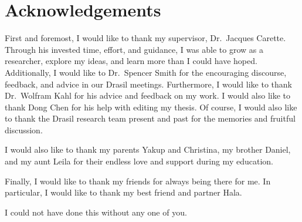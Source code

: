 \chapter{Acknowledgements}
\label{chap:acknowledgements}

First and foremost, I would like to thank my supervisor, Dr.\ Jacques Carette.
Through his invested time, effort, and guidance, I was able to grow as a
researcher, explore my ideas, and learn more than I could have hoped.
Additionally, I would like to Dr.\ Spencer Smith for the encouraging discourse,
feedback, and advice in our Drasil meetings. Furthermore, I would like to thank
Dr.\ Wolfram Kahl for his advice and feedback on my work. I would also like to
thank Dong Chen for his help with editing my thesis. Of course, I would also
like to thank the Drasil research team present and past for the memories and
fruitful discussion.

I would also like to thank my parents Yakup and Christina, my brother Daniel,
and my aunt Leila for their endless love and support during my education.

Finally, I would like to thank my friends for always being there for me. In
particular, I would like to thank my best friend and partner Hala.

I could not have done this without any one of you.
